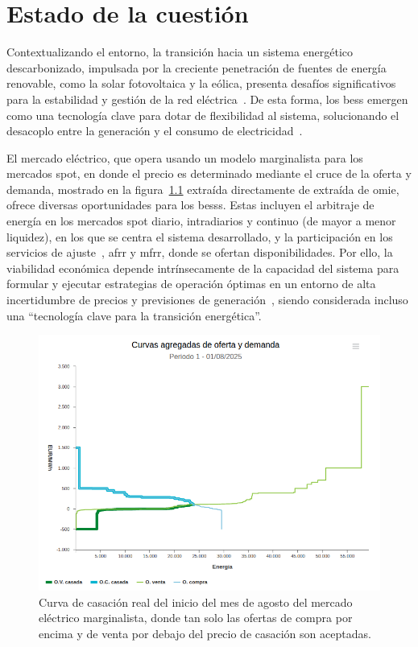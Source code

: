 \cleardoublepage

\chapter{Estado de la cuestión}
\label{makereference2}

Contextualizando el entorno, la transición hacia un sistema energético descarbonizado, impulsada por la creciente penetración de fuentes de energía renovable, como la solar fotovoltaica y la eólica, presenta desafíos significativos para la estabilidad y gestión de la red eléctrica~\cite{carrasco2023battery}. De esta forma, los \gls{bess} emergen como una tecnología clave para dotar de flexibilidad al sistema, solucionando el desacoplo entre la generación y el consumo de electricidad~\cite{gissey2018market}.

El mercado eléctrico, que opera usando un modelo marginalista para los mercados spot, en donde el precio es determinado mediante el cruce de la oferta y demanda, mostrado en la figura~\ref{fig:precio-casacion} extraída directamente de extraída de \gls{omie}, ofrece diversas oportunidades para los \glspl{bess}. Estas incluyen el arbitraje de energía en los mercados spot diario, intradiarios y continuo (de mayor a menor liquidez), en los que se centra el sistema desarrollado, y la participación en los servicios de ajuste~\cite{gaspar2021optimisation}, \gls{afrr} y \gls{mfrr}, donde se ofertan disponibilidades. Por ello, la viabilidad económica depende intrínsecamente de la capacidad del sistema para formular y ejecutar estrategias de operación óptimas en un entorno de alta incertidumbre de precios y previsiones de generación~\cite{heredia2015economic}, siendo considerada incluso una ``tecnología clave para la transición energética''.

\begin{figure}
  \centering
  \includegraphics[width=0.75\linewidth]{figures/precio-casacion.png}
  \caption{Curva de casación real del inicio del mes de agosto del mercado eléctrico marginalista, donde tan solo las ofertas de compra por encima y de venta por debajo del precio de casación son aceptadas.}
  \label{fig:precio-casacion}
\end{figure}

